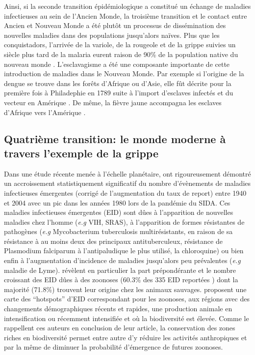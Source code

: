 Ainsi, si la seconde transition épidémiologique a constitué un échange
de maladies infectieuses au sein de l'Ancien Monde, la troisième
transition et le contact entre Ancien et Nouveau Monde a été plutôt un
processus de dissémination des nouvelles maladies dans des populations
jusqu'alors naïves. Plus que les conquistadors, l'arrivée de la
variole, de la rougeole et de la grippe suivies un siècle plus tard de
la malaria eurent raison de 90\% de la population native du nouveau
monde \citep{McMichael2001}. L'esclavagisme a été une composante
importante de cette introduction de maladies dans le Nouveau Monde.
Par exemple si l'origine de la dengue se trouve dans les forêts
d'Afrique ou d'Asie, elle fût décrite pour la première fois à
Philadephie en 1789 suite à l'import d'esclaves infectés et du vecteur
en Amérique \citep{Holmes2008}. De même, la fièvre jaune accompagna
les esclaves d'Afrique vers l'Amérique \citep{Bryant2007}.

\subsection{Quatrième  transition: le monde moderne à travers
  l'exemple de la grippe}


Dans une étude récente menée à l'échelle planétaire, \citet{Jones2008}
ont rigoureusement démontré un accroissement statistiquement
significatif du nombre d'évènements de maladies infectieuses
émergentes (corrigé de l'augmentation du taux de report) entre 1940 et
2004 avec un pic dans les années 1980 lors de la pandémie du SIDA. Ces
maladies infectieuses émergentes (EID) sont dûes à l'apparition de
nouvelles maladies chez l'homme (\textit{e.g} VIH, SRAS), à
l'apparition de formes résistantes de pathogènes (\textit{e.g}
Mycobacterium tuberculosis multirésistants, en raison de sa résistance
à au moins deux des principaux antituberculeux, résistance de
Plasmodium falciparum à l'antipaludique le plus utilisé, la
chloroquine) ou bien enfin à l'augmentation d'incidence de maladies
jusqu'alors peu prévalentes (\textit{e.g} maladie de Lyme).
\citet{Jones2008} révèlent en particulier la part prépondérante et le
nombre croissant des EID dûes à des zoonoses (60.3\% des 335 EID
reportées ) dont la majorité (71.8\%) trouvent leur origine chez les
animaux sauvages. \citet{Jones2008} proposent une carte des
``hotspots'' d'EID correspondant pour les zoonoses, aux régions avec
des changements démographiques récents et rapides, une production
animale en intensification ou récemment intensifiée et où la
biodiversité est élevée. Comme le rappellent ces auteurs en conclusion
de leur article, la conservation des zones riches en biodiversité
permet entre autre d'y réduire les activités anthropiques et par la
même de diminuer la probabilité d'émergence de futures zoonoses.

